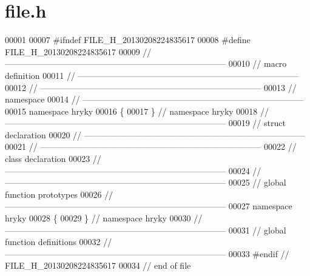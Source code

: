 \hypertarget{file_8h_source}{\section{file.\-h}
}

\begin{DoxyCode}
00001 
00007 \textcolor{preprocessor}{#ifndef FILE\_H\_20130208224835617}
00008 \textcolor{preprocessor}{}\textcolor{preprocessor}{#define FILE\_H\_20130208224835617}
00009 \textcolor{preprocessor}{}\textcolor{comment}{//
      ------------------------------------------------------------------------------}
00010 \textcolor{comment}{// macro definition}
00011 \textcolor{comment}{//
      ------------------------------------------------------------------------------}
00012 \textcolor{comment}{//
      ------------------------------------------------------------------------------}
00013 \textcolor{comment}{// namespace}
00014 \textcolor{comment}{//
      ------------------------------------------------------------------------------}
00015 \textcolor{keyword}{namespace }hryky
00016 \{
00017 \} \textcolor{comment}{// namespace hryky}
00018 \textcolor{comment}{//
      ------------------------------------------------------------------------------}
00019 \textcolor{comment}{// struct declaration}
00020 \textcolor{comment}{//
      ------------------------------------------------------------------------------}
00021 \textcolor{comment}{//
      ------------------------------------------------------------------------------}
00022 \textcolor{comment}{// class declaration}
00023 \textcolor{comment}{//
      ------------------------------------------------------------------------------}
00024 \textcolor{comment}{//
      ------------------------------------------------------------------------------}
00025 \textcolor{comment}{// global function prototypes}
00026 \textcolor{comment}{//
      ------------------------------------------------------------------------------}
00027 \textcolor{keyword}{namespace }hryky
00028 \{
00029 \} \textcolor{comment}{// namespace hryky}
00030 \textcolor{comment}{//
      ------------------------------------------------------------------------------}
00031 \textcolor{comment}{// global function definitions}
00032 \textcolor{comment}{//
      ------------------------------------------------------------------------------}
00033 \textcolor{preprocessor}{#endif // FILE\_H\_20130208224835617}
00034 \textcolor{preprocessor}{}\textcolor{comment}{// end of file}
\end{DoxyCode}

